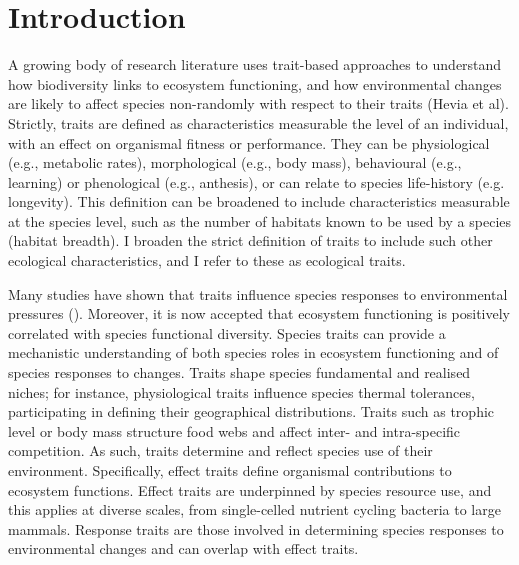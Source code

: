 \section{Introduction}

A growing body of research literature uses trait-based approaches to understand how biodiversity links to ecosystem functioning, and how environmental changes are likely to affect species non-randomly with respect to their traits (Hevia et al). Strictly, traits are defined as characteristics measurable the level of an individual, with an effect on organismal fitness or performance. They can be physiological (e.g., metabolic rates), morphological (e.g., body mass), behavioural (e.g., learning) or phenological (e.g., anthesis), or can relate to species life-history (e.g. longevity). This definition can be broadened to include characteristics measurable at the species level, such as the number of habitats known to be used by a species (habitat breadth). I broaden the strict definition of traits to include such other ecological characteristics, and I refer to these as ecological traits.

Many studies have shown that traits influence species responses to environmental pressures (). Moreover, it is now accepted that ecosystem functioning is positively correlated with species functional diversity. Species traits can provide a mechanistic understanding of both species roles in ecosystem functioning and of species responses to changes. Traits shape species fundamental and realised niches; for instance, physiological traits influence species thermal tolerances, participating in defining their geographical distributions. Traits such as trophic level or body mass structure food webs and affect inter- and intra-specific competition. As such, traits determine and reflect species use of their environment. Specifically, effect traits define organismal contributions to ecosystem functions. Effect traits are underpinned by species resource use, and this applies at diverse scales, from single-celled nutrient cycling bacteria to large mammals. Response traits are those involved in determining species responses to environmental changes and can overlap with effect traits. 

